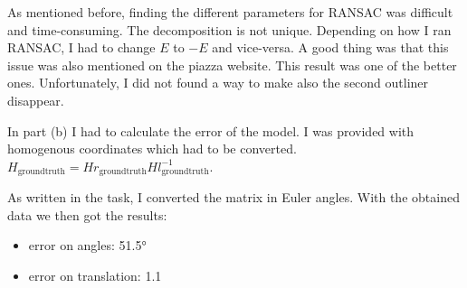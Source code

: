 \documentclass[12pt]{article}
\begin{document}
As mentioned before, finding the different parameters for RANSAC was difficult and time-consuming. 
The decomposition is not unique. Depending on how I ran RANSAC, I had to change $E$ to $-E$ and 
vice-versa. A good thing was that this issue was also mentioned on the piazza website. This result was one of 
the better ones. Unfortunately, I did not found a way to make also the second outliner disappear.

In part (b) I had to calculate the error of the model. I was provided with homogenous coordinates which 
had to be converted. $H_{\mathrm{ground truth}} = H r_{\mathrm{ground truth}} H l_{\mathrm{ground truth}}^{-1}$.

As written in the task, I converted the matrix in Euler angles. With the obtained data we then got the results:

\begin{itemize}
    \item error on angles: 51.5°
    \item error on translation: 1.1
  \end{itemize}
\end{document}
